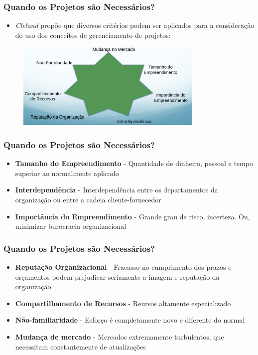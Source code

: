 \begin{frame}
 \frametitle{Quando os Projetos são Necessários?}
 \begin{itemize}
  \item \textit{Cleland} propõe que diversos critérios podem ser aplicados para a consideração do uso
  dos conceitos de gerenciamento de projetos:
 \end{itemize}

 \begin{figure}
  \centering
  \includegraphics[width = 0.8\textwidth]{figs/fig6.png}
 \end{figure}

\end{frame}

  
  \begin{frame}
   \frametitle{Quando os Projetos são Necessários?}
   \begin{itemize}
    \item \textbf{Tamanho do Empreendimento} - Quantidade de dinheiro, pessoal e tempo superior ao normalmente aplicado
    \item \textbf{Interdependência} - Interdependência entre os departamentos da organização ou entre a cadeia cliente-fornecedor
    \item \textbf{Importância do Empreendimento} - Grande grau de risco, incerteza. Ou, minimizar burocracia organizacional	
    
   \end{itemize}
  \end{frame}
  
    \begin{frame}
   \frametitle{Quando os Projetos são Necessários?}
   \begin{itemize}
    \item \textbf{Reputação Organizacional} - Fracasso no cumprimento dos prazos e orçamentos podem prejudicar seriamente a imagem e reputação da organização
    \item \textbf{Compartilhamento de Recursos} - Reursos altamente especializado
    \item \textbf{Não-familiaridade} - Esforço é completamente novo e diferente do normal
    \item \textbf{Mudança de mercado} - Mercados extremamente turbulentos, que necessitam constantemente de atualizações
   \end{itemize}
  \end{frame}


